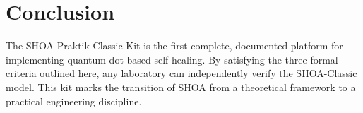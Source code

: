 \documentclass[12pt]{article}
\begin{document}
\section{Conclusion}
The SHOA-Praktik Classic Kit is the first complete, documented platform for implementing quantum dot-based self-healing. By satisfying the three formal criteria outlined here, any laboratory can independently verify the SHOA-Classic model. This kit marks the transition of SHOA from a theoretical framework to a practical engineering discipline.
\end{document}

